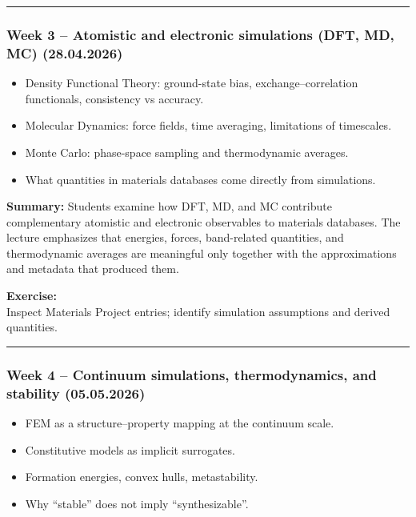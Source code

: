 \documentclass[
]{agujournal2019}
\providecommand{\tightlist}{%
  \setlength{\itemsep}{0pt}\setlength{\parskip}{0pt}}
\begin{document}
\begin{center}\rule{0.5\linewidth}{0.5pt}\end{center}

\subsubsection{Week 3 -- Atomistic and electronic simulations (DFT, MD,
MC)
(28.04.2026)}\label{week-3-atomistic-and-electronic-simulations-dft-md-mc-28.04.2026}

\begin{itemize}
\tightlist
\item
  Density Functional Theory: ground-state bias, exchange--correlation
  functionals, consistency vs accuracy.
\item
  Molecular Dynamics: force fields, time averaging, limitations of
  timescales.
\item
  Monte Carlo: phase-space sampling and thermodynamic averages.
\item
  What quantities in materials databases come directly from simulations.
\end{itemize}

\textbf{Summary:} Students examine how DFT, MD, and MC contribute
complementary atomistic and electronic observables to materials
databases. The lecture emphasizes that energies, forces, band-related
quantities, and thermodynamic averages are meaningful only together with
the approximations and metadata that produced them.

\textbf{Exercise:}\\
Inspect Materials Project entries; identify simulation assumptions and
derived quantities.

\begin{center}\rule{0.5\linewidth}{0.5pt}\end{center}

\subsubsection{Week 4 -- Continuum simulations, thermodynamics, and
stability
(05.05.2026)}\label{week-4-continuum-simulations-thermodynamics-and-stability-05.05.2026}

\begin{itemize}
\tightlist
\item
  FEM as a structure--property mapping at the continuum scale.
\item
  Constitutive models as implicit surrogates.
\item
  Formation energies, convex hulls, metastability.
\item
  Why ``stable'' does not imply ``synthesizable''.
\end{itemize}
\end{document}
